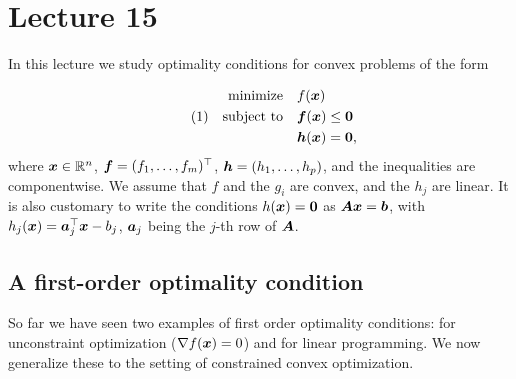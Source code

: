 %
%
% 


\chapter*{Lecture 15}
\addtocounter{chapter}{15}
\addtocounter{section}{0}


In this lecture we study optimality conditions for convex problems of the form

\begin{align*}\label{eq:constr}\tag{1}
\begin{split}
 \text{minimize}\quad & f(\bm{x})\\
 \quad\text{subject to}\quad & \bm{f}(\bm{x})\leq \bm{0}\\
         & \bm{h}(\bm{x})= \bm{0},
\end{split}
\end{align*}
where $\bm{x}\in \mathbb{R}^n$, $\bm{f}=(f_1,\dots,f_m)^{\top}$, $\bm{h}=(h_1,\dots,h_p)$, and the inequalities are componentwise. We assume that $f$ and the $g_i$ are convex, and the $h_j$ are linear. It is also customary to write the conditions $h(\bm{x})=\bm{0}$ as $\bm{A}\bm{x}=\bm{b}$, with $h_j(\bm{x}) = \bm{a}_j^{\top}\bm{x}-b_j$, $\bm{a}_j$ being the $j$-th row of $\bm{A}$.

\section{A first-order optimality condition}
So far we have seen two examples of first order optimality conditions: for unconstraint optimization ($\nabla f(\bm{x})=0$) and for linear programming. We now generalize these to the setting of constrained convex optimization.

